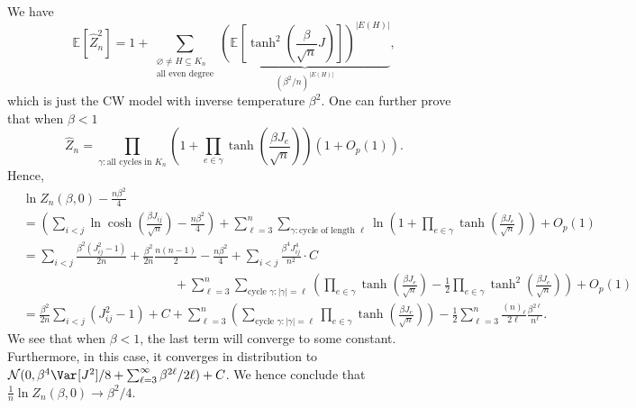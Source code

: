 We have
\[
	\mathbb{E}_{}[\hat{Z} _n^2]
	= 1 + \sum_{\substack{\varnothing \neq H \subseteq K_n\\ \text{all even degree} }} \underbrace{\left( \mathbb{E}_{}\left[\tanh ^2 (\frac{\beta }{\sqrt{n} } J)\right] \right) ^{\lvert E(H) \rvert }}_{(\beta ^2 / n)^{\lvert E(H) \rvert }} ,
\]
which is just the CW model with inverse temperature \(\beta ^2\). One can further prove that when \(\beta < 1\)
\[
	\hat{Z} _n
	= \prod_{\gamma \colon \text{all cycles in } K_n} \left( 1 + \prod_{e \in \gamma } \tanh(\frac{\beta J_e}{\sqrt{n} }) \right) (1 + O_p(1)).
\]
Hence,
\[
	\begin{split}
		 & \ln Z_n(\beta , 0) - \frac{n \beta ^2}{4}                                                                                                                                                                                                                                                                             \\
		 & = \left( \sum_{i < j} \ln \cosh(\frac{\beta J_{ij}}{\sqrt{n} }) - \frac{n \beta ^2}{4} \right) + \sum_{\ell = 3}^{n} \sum_{\gamma \colon \text{cycle of length } \ell } \ln (1 + \prod_{e \in \gamma } \tanh (\frac{\beta J_e}{\sqrt{n} })) + O_p(1)                                                                  \\
		 & = \sum_{i < j}  \frac{\beta ^2 (J_{ij} ^2 - 1)}{2n} + \frac{\beta ^2}{2n} \frac{n(n-1)}{2} - \frac{n \beta ^2}{4} + \sum_{i < j} \frac{\beta ^4 J_{ij} ^4}{n^2} \cdot C                                                                                                                                               \\
		 & \qquad\qquad\qquad\qquad\qquad\qquad+ \sum_{\ell = 3}^{n} \sum_{\text{cycle } \gamma \colon \lvert \gamma \rvert = \ell } \left( \prod_{e \in \gamma } \tanh (\frac{\beta J_e}{\sqrt{n} }) - \frac{1}{2} \prod_{e \in \gamma } \tanh^2(\frac{\beta J_e}{\sqrt{n} }) \right) + O_p(1)                                  \\
		 & = \frac{\beta ^2}{2n} \sum_{i < j} (J_{ij}^2 - 1) + C + \sum_{\ell = 3}^{n} \left( \sum_{\text{cycle } \gamma \colon \lvert \gamma \rvert = \ell } \prod_{e \in \gamma } \tanh (\frac{\beta J_e}{\sqrt{n} }) \right) - \frac{1}{2} \sum_{\ell =3}^{n} \frac{(n)_{\ell }}{2 \ell } \frac{\beta ^{2 \ell }}{n^{\ell }}.
	\end{split}
\]
We see that when \(\beta < 1\), the last term will converge to some constant. Furthermore, in this case, it converges in distribution to \(\mathcal{N} (0, \beta ^4 \Var_{}[J^2] / 8 + \sum_{\ell = 3}^{\infty } \beta ^{2 \ell } / 2\ell ) + C\). We hence conclude that \(\frac{1}{n} \ln Z_n(\beta , 0) \to \beta ^2 / 4\).

